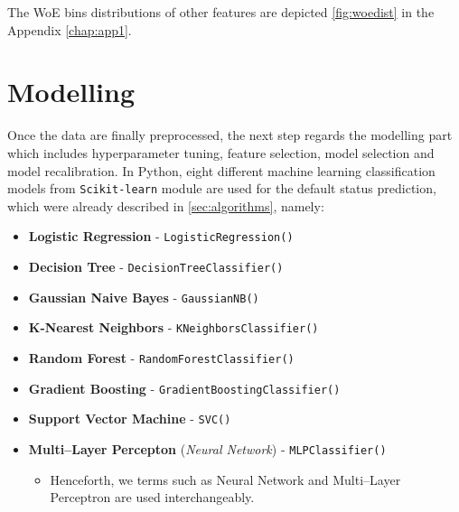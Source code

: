 The WoE bins distributions of other features are depicted \autoref{fig:woedist} in the Appendix \autoref{chap:app1}.



\newpage
\section{Modelling}
\label{sec:modelling}
Once the data are finally preprocessed, the next step regards the modelling part which includes hyperparameter tuning, feature selection, model selection and model recalibration.
In Python, eight different machine learning classification models from \lstinline{Scikit-learn} module are used for the default status prediction, which were already described in \autoref{sec:algorithms}, namely:
\begin{itemize}\setlength\itemsep{0em}
\item \textbf{Logistic Regression} - \lstinline{LogisticRegression()}
\item \textbf{Decision Tree} - \lstinline{DecisionTreeClassifier()}
\item \textbf{Gaussian Naive Bayes} - \lstinline{GaussianNB()}
\item \textbf{K-Nearest Neighbors} - \lstinline{KNeighborsClassifier()}
\item \textbf{Random Forest} - \lstinline{RandomForestClassifier()}
\item \textbf{Gradient Boosting} - \lstinline{GradientBoostingClassifier()}
\item \textbf{Support Vector Machine} - \lstinline{SVC()}
\item \textbf{Multi--Layer Percepton} (\textit{Neural Network}) - \lstinline{MLPClassifier()}
\begin{itemize}\setlength\itemsep{0em}
\item Henceforth, we terms such as Neural Network and Multi--Layer Perceptron are used interchangeably.
\end{itemize}
\end{itemize}

